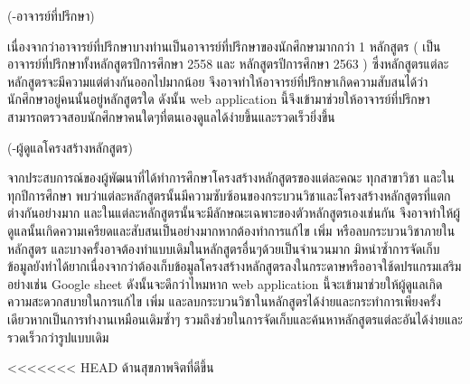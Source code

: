 {(-อาจารย์ที่ปรึกษา)}

{เนื่องจากว่าอาจารย์ที่ปรึกษาบางท่านเป็นอาจารย์ที่ปรึกษาของนักศึกษามากกว่า 1 หลักสูตร ( เป็นอาจารย์ที่ปรึกษาทั้งหลักสูตรปีการศึกษา 2558 และ หลักสูตรปีการศึกษา 2563 ) ซึ่งหลักสูตรแต่ละหลักสูตรจะมีความแต่ต่างกันออกไปมากน้อย จึงอาจทำให้อาจารย์ที่ปรึกษาเกิดความสับสนได้ว่านักศึกษาอยู่คนนั้นอยู่หลักสูตรใด ดังนั้น web application นี้จึงเข้ามาช่วยให้อาจารย์ที่ปรึกษาสามารถตรวจสอบนักศึกษาคนใดๆที่ตนเองดูแลได้ง่ายขึ้นและรวดเร็วยิ่งขึ้น
 }	

{(-ผู้ดูแลโครงสร้างหลักสูตร)}

{จากประสบการณ์ของผู้พัฒนาที่ได้ทำการศึกษาโครงสร้างหลักสูตรของแต่ละคณะ ทุกสาขาวิชา และในทุกปีการศึกษา พบว่าแต่ละหลักสูตรนั้นมีความซับซ้อนของกระบวนวิชาและโครงสร้างหลักสูตรที่แตกต่างกันอย่างมาก และในแต่ละหลักสูตรนั้นจะมีลักษณะเฉพาะของตัวหลักสูตรเองเช่นกัน จึงอาจทำให้ผู้ดูแลนั้นเกิดความเครียดและสับสนเป็นอย่างมากหากต้องทำการแก้ไข เพิ่ม หรือลบกระบวนวิชาภายในหลักสูตร และบางครั้งอาจต้องทำแบบเดิมในหลักสูตรอื่นๆด้วยเป็นจำนวนมาก มิหนำซ้ำการจัดเก็บข้อมูลยังทำได้ยากเนื่องจากว่าต้องเก็บข้อมูลโครงสร้างหลักสูตรลงในกระดาษหรืออาจใช้ดปรแกรมเสริมอย่างเช่น Google sheet ดังนั้นจะดีกว่าไหมหาก web application นี้จะเข้ามาช่วยให้ผู้ดูแลเกิดความสะดวกสบายในการแก้ไข เพิ่ม และลบกระบวนวิชาในหลักสูตรได้ง่ายและกระทำการเพียงครั้งเดียวหากเป็นการทำงานเหมือนเดิมซ้ำๆ รวมถึงช่วยในการจัดเก็บและค้นหาหลักสูตรแต่ละอันได้ง่ายและรวดเร็วกว่ารูปแบบเดิม   
}
		



<<<<<<< HEAD
ด้านสุขภาพจิตที่ดีขึ้น 

